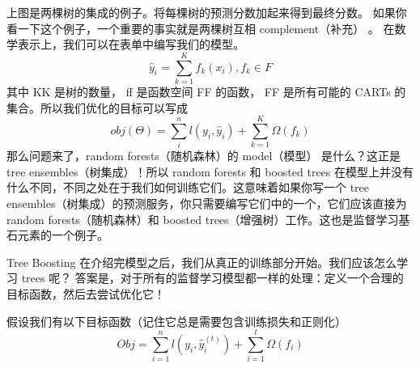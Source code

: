 \documentclass{article}
\begin{document}
上图是两棵树的集成的例子。将每棵树的预测分数加起来得到最终分数。 如果你看一下这个例子，一个重要的事实就是两棵树互相 complement（补充） 。 在数学表示上，我们可以在表单中编写我们的模型。
\[\hat{y}_i=\sum_{k=1}^Kf_k(x_i),f_k\in F\]
其中 KK 是树的数量， ff 是函数空间 FF 的函数， FF 是所有可能的 CARTs 的集合。所以我们优化的目标可以写成
\[obj(\Theta)=\sum_i^n l(y_i,\hat{y}_i)+\sum_{k=1}^K\Omega(f_k)\]
那么问题来了，random forests（随机森林）的 model（模型） 是什么？这正是 tree ensembles（树集成）！所以 random forests 和 boosted trees 在模型上并没有什么不同，不同之处在于我们如何训练它们。这意味着如果你写一个 tree ensembles（树集成）的预测服务，你只需要编写它们中的一个，它们应该直接为 random forests（随机森林）和 boosted trees（增强树）工作。这也是监督学习基石元素的一个例子。

Tree Boosting
在介绍完模型之后，我们从真正的训练部分开始。我们应该怎么学习 trees 呢？ 答案是，对于所有的监督学习模型都一样的处理：定义一个合理的目标函数，然后去尝试优化它！

假设我们有以下目标函数（记住它总是需要包含训练损失和正则化）
\[Obj=\sum_{i=1}^n l(y_i,\hat{y}_i^{(t)})+\sum_{i=1}^t\Omega(f_i)\]
\end{document}
